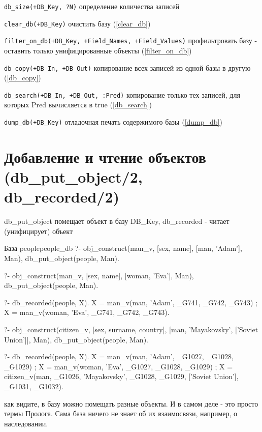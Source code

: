 \documentclass[a4paper]{book}
\begin{document}
\begin{description}
\item \verb|db_size(+DB_Key, ?N)| определение количества записей
\item \verb|clear_db(+DB_Key)| очистить базу (\ref{clear_db})
\item \verb|filter_on_db(+DB_Key, +Field_Names, +Field_Values)|
  профильтровать базу - оставить только унифицированные объекты
  (\ref{filter_on_db})
\item \verb|db_copy(+DB_In, +DB_Out)| копирование всех записей из
  одной базы в другую (\ref{db_copy})
\item \verb|db_search(+DB_In, +DB_Out, :Pred)| копирование только
  тех записей, для которых Pred вычисляется в true
  (\ref{db_search})
\item \verb|dump_db(+DB_Key)| отладочная печать содержимого базы
  (\ref{dump_db})
\end{description}


\section{Добавление и чтение объектов (db\_put\_object/2,
  db\_recorded/2)}
\label{db_put_object/2}
\label{db_recorded/2}

db\_put\_object помещает объект в базу DB\_Key, db\_recorded -
читает (унифицирует) объект

\begin{example}{База people}{people_db}
?- obj_construct(man_v, 
      [sex, name], 
      [man, 'Adam'], Man), 
   db_put_object(people, Man).

?- obj_construct(man_v, 
      [sex, name], 
      [woman, 'Eva'], Man), 
   db_put_object(people, Man).

?- db_recorded(people, X).
X = man_v(man, 'Adam', _G741, _G742, _G743) ;
X = man_v(woman, 'Eva', _G741, _G742, _G743).

?- obj_construct(citizen_v, 
      [sex, surname, country], 
      [man, 'Mayakovsky', ['Soviet Union']], Man), 
   db_put_object(people, Man). 

?- db_recorded(people, X).
X = man_v(man, 'Adam', _G1027, _G1028, _G1029) ;
X = man_v(woman, 'Eva', _G1027, _G1028, _G1029) ;
X = citizen_v(man, _G1026, 'Mayakovsky', _G1028, _G1029, ['Soviet Union'], _G1031, _G1032).
\end{example}

как видите, в базу можно помещать разные объекты. И в самом деле
- это просто термы Пролога. Сама база ничего не знает об их
взаимосвязи, например, о наследовании.
\end{document}
